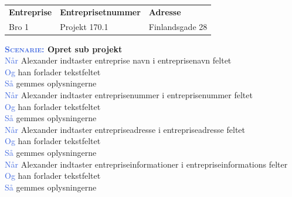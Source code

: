 \begin{tabular}{| l | l | l |}
	\textbf{Entreprise} & \textbf{Entreprisetnummer} & \textbf{Adresse} \\
	Bro 1 & Projekt 170.1 & Finlandsgade 28 \\
\end{tabular}
\newline \newline

\textbf{\textsc{\textcolor{RoyalBlue}{Scenarie:}} Opret sub projekt}\\
\textcolor{RoyalBlue}{Når} Alexander indtaster entreprise navn i entreprisenavn feltet\\
\textcolor{RoyalBlue}{Og} han forlader tekstfeltet\\
\textcolor{RoyalBlue}{Så} gemmes oplysningerne\\
\textcolor{RoyalBlue}{Når} Alexander indtaster entreprisenummer i entreprisenummer feltet\\
\textcolor{RoyalBlue}{Og} han forlader tekstfeltet\\
\textcolor{RoyalBlue}{Så} gemmes oplysningerne\\
\textcolor{RoyalBlue}{Når} Alexander indtaster entrepriseadresse i entrepriseadresse feltet\\
\textcolor{RoyalBlue}{Og} han forlader tekstfeltet\\
\textcolor{RoyalBlue}{Så} gemmes oplysningerne\\
\textcolor{RoyalBlue}{Når} Alexander indtaster entrepriseinformationer i entrepriseinformations felter\\
\textcolor{RoyalBlue}{Og} han forlader tekstfeltet\\
\textcolor{RoyalBlue}{Så} gemmes oplysningerne\\
